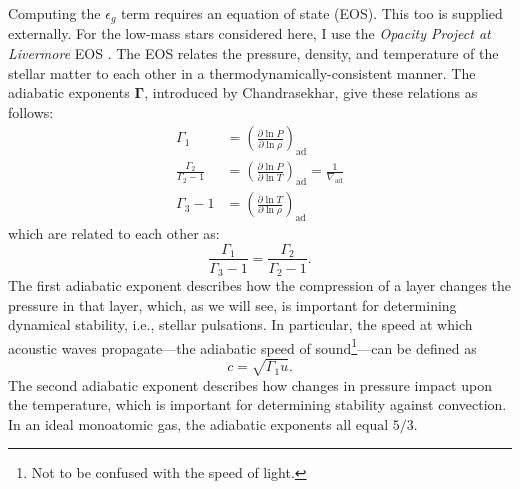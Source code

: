 \begin{description}
    Computing the $\epsilon_g$ term requires an equation of state (EOS). 
    This too is supplied externally. For the low-mass stars considered here, I use the \emph{Opacity Project at Livermore} EOS \citep[\textsc{OPAL},][]{2002apj...576.1064r}. 
    The EOS relates the pressure, density, and temperature of the stellar matter to each other in a thermodynamically-consistent manner. 
    The adiabatic exponents $\boldsymbol\Gamma$, introduced by Chandrasekhar, give these relations as follows: %
    \begin{align} 
        \Gamma_1 
        &= 
        \left(
            \frac{\partial \ln P}{\partial \ln \rho}
        \right)_{\text{ad}} 
        \\
        \frac{\Gamma_2}{\Gamma_2-1}
        &= \label{eq:gamma2}
        \left(
            \frac{\partial \ln P}{\partial \ln T}
        \right)_{\text{ad}} = \frac{1}{\nabla_{\text{ad}}}
        \\
        \Gamma_3 - 1 
        &= 
        \left(
            \frac{\partial \ln T}{\partial \ln \rho}
        \right)_{\text{ad}}
    \end{align}
    which are related to each other as: 
    \begin{equation}
        \frac{\Gamma_1}{\Gamma_3 - 1}
        =
        \frac{\Gamma_2}{\Gamma_2-1}.
    \end{equation}
    The first adiabatic exponent describes how the compression of a layer changes the pressure in that layer, which, as we will see, is important for determining dynamical stability, i.e., stellar pulsations. 
    In particular,  the speed at which acoustic waves propagate---the adiabatic speed of sound\footnote{ Not to be confused with the speed of light.}---can be defined as 
    \begin{equation} \label{eq:speed-of-sound}
        c = \sqrt{\Gamma_1 u}. 
    \end{equation}
    The second adiabatic exponent describes how changes in pressure impact upon the temperature, which is important for determining stability against convection. 
    In an ideal monoatomic gas, the adiabatic exponents all equal $5/3$. %


\end{description}
